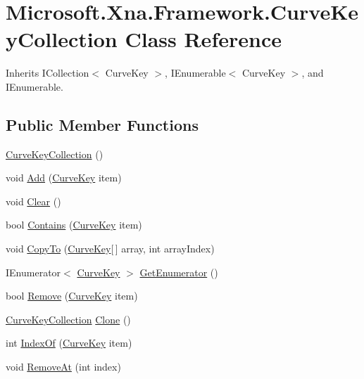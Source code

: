 \hypertarget{class_microsoft_1_1_xna_1_1_framework_1_1_curve_key_collection}{\section{Microsoft.\+Xna.\+Framework.\+Curve\+Key\+Collection Class Reference}
\label{class_microsoft_1_1_xna_1_1_framework_1_1_curve_key_collection}
}


Inherits I\+Collection$<$ Curve\+Key $>$, I\+Enumerable$<$ Curve\+Key $>$, and I\+Enumerable.

\subsection*{Public Member Functions}
\begin{DoxyCompactItemize}
\item 
\hyperlink{class_microsoft_1_1_xna_1_1_framework_1_1_curve_key_collection_a5bd86f6ebcced1b29057db8c3c30fbc9}{Curve\+Key\+Collection} ()
\item 
void \hyperlink{class_microsoft_1_1_xna_1_1_framework_1_1_curve_key_collection_a3796a2866faad79a9b466b41dce3ea18}{Add} (\hyperlink{class_microsoft_1_1_xna_1_1_framework_1_1_curve_key}{Curve\+Key} item)
\item 
void \hyperlink{class_microsoft_1_1_xna_1_1_framework_1_1_curve_key_collection_a23b231a971138c9b4e06565546f41e64}{Clear} ()
\item 
bool \hyperlink{class_microsoft_1_1_xna_1_1_framework_1_1_curve_key_collection_a4fa9cbb5bf89c99208a6eb377589fb05}{Contains} (\hyperlink{class_microsoft_1_1_xna_1_1_framework_1_1_curve_key}{Curve\+Key} item)
\item 
void \hyperlink{class_microsoft_1_1_xna_1_1_framework_1_1_curve_key_collection_a621a8951c0b832cbdc84e772f8ca5a7e}{Copy\+To} (\hyperlink{class_microsoft_1_1_xna_1_1_framework_1_1_curve_key}{Curve\+Key}\mbox{[}$\,$\mbox{]} array, int array\+Index)
\item 
I\+Enumerator$<$ \hyperlink{class_microsoft_1_1_xna_1_1_framework_1_1_curve_key}{Curve\+Key} $>$ \hyperlink{class_microsoft_1_1_xna_1_1_framework_1_1_curve_key_collection_a16f9cb8f925c32778398ad856162b1af}{Get\+Enumerator} ()
\item 
bool \hyperlink{class_microsoft_1_1_xna_1_1_framework_1_1_curve_key_collection_a8b235c98c2475c714df153ef78c40be3}{Remove} (\hyperlink{class_microsoft_1_1_xna_1_1_framework_1_1_curve_key}{Curve\+Key} item)
\item 
\hyperlink{class_microsoft_1_1_xna_1_1_framework_1_1_curve_key_collection}{Curve\+Key\+Collection} \hyperlink{class_microsoft_1_1_xna_1_1_framework_1_1_curve_key_collection_ad9b19b679596728fc49c4abf6cde270d}{Clone} ()
\item 
int \hyperlink{class_microsoft_1_1_xna_1_1_framework_1_1_curve_key_collection_a4295a550b2e8876babc36dce4b0c7dbf}{Index\+Of} (\hyperlink{class_microsoft_1_1_xna_1_1_framework_1_1_curve_key}{Curve\+Key} item)
\item 
void \hyperlink{class_microsoft_1_1_xna_1_1_framework_1_1_curve_key_collection_abbf9e1567fe8578b12726490f8f6fd07}{Remove\+At} (int index)
\end{DoxyCompactItemize}
